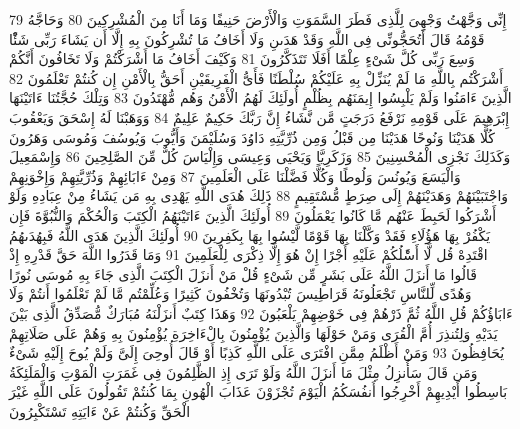 {\tiny\colorbox{cl_aya}{79}} إِنِّى وَجَّهْتُ وَجْهِىَ لِلَّذِى فَطَرَ السَّمَوَتِ وَالْأَرْضَ حَنِيفًا وَمَا أَنَا مِنَ الْمُشْرِكِينَ
{\tiny\colorbox{cl_aya}{80}} وَحَاجَّهُ قَوْمُهُ قَالَ أَتُحَجُّونِّى فِى اللَّهِ وَقَدْ هَدَىنِ وَلَا أَخَافُ مَا تُشْرِكُونَ بِهِ إِلَّا أَن يَشَاءَ رَبِّى شَئًْا وَسِعَ رَبِّى كُلَّ شَىْءٍ عِلْمًا أَفَلَا تَتَذَكَّرُونَ
{\tiny\colorbox{cl_aya}{81}} وَكَيْفَ أَخَافُ مَا أَشْرَكْتُمْ وَلَا تَخَافُونَ أَنَّكُمْ أَشْرَكْتُم بِاللَّهِ مَا لَمْ يُنَزِّلْ بِهِ عَلَيْكُمْ سُلْطَنًا فَأَىُّ الْفَرِيقَيْنِ أَحَقُّ بِالْأَمْنِ إِن كُنتُمْ تَعْلَمُونَ
{\tiny\colorbox{cl_aya}{82}} الَّذِينَ ءَامَنُوا وَلَمْ يَلْبِسُوا إِيمَنَهُم بِظُلْمٍ أُولَئِكَ لَهُمُ الْأَمْنُ وَهُم مُّهْتَدُونَ
{\tiny\colorbox{cl_aya}{83}} وَتِلْكَ حُجَّتُنَا ءَاتَيْنَهَا إِبْرَهِيمَ عَلَى قَوْمِهِ نَرْفَعُ دَرَجَتٍ مَّن نَّشَاءُ إِنَّ رَبَّكَ حَكِيمٌ عَلِيمٌ
{\tiny\colorbox{cl_aya}{84}} وَوَهَبْنَا لَهُ إِسْحَقَ وَيَعْقُوبَ كُلًّا هَدَيْنَا وَنُوحًا هَدَيْنَا مِن قَبْلُ وَمِن ذُرِّيَّتِهِ دَاوُدَ وَسُلَيْمَنَ وَأَيُّوبَ وَيُوسُفَ وَمُوسَى وَهَرُونَ وَكَذَلِكَ نَجْزِى الْمُحْسِنِينَ
{\tiny\colorbox{cl_aya}{85}} وَزَكَرِيَّا وَيَحْيَى وَعِيسَى وَإِلْيَاسَ كُلٌّ مِّنَ الصَّلِحِينَ
{\tiny\colorbox{cl_aya}{86}} وَإِسْمَعِيلَ وَالْيَسَعَ وَيُونُسَ وَلُوطًا وَكُلًّا فَضَّلْنَا عَلَى الْعَلَمِينَ
{\tiny\colorbox{cl_aya}{87}} وَمِنْ ءَابَائِهِمْ وَذُرِّيَّتِهِمْ وَإِخْوَنِهِمْ وَاجْتَبَيْنَهُمْ وَهَدَيْنَهُمْ إِلَى صِرَطٍ مُّسْتَقِيمٍ
{\tiny\colorbox{cl_aya}{88}} ذَلِكَ هُدَى اللَّهِ يَهْدِى بِهِ مَن يَشَاءُ مِنْ عِبَادِهِ وَلَوْ أَشْرَكُوا لَحَبِطَ عَنْهُم مَّا كَانُوا يَعْمَلُونَ
{\tiny\colorbox{cl_aya}{89}} أُولَئِكَ الَّذِينَ ءَاتَيْنَهُمُ الْكِتَبَ وَالْحُكْمَ وَالنُّبُوَّةَ فَإِن يَكْفُرْ بِهَا هَؤُلَاءِ فَقَدْ وَكَّلْنَا بِهَا قَوْمًا لَّيْسُوا بِهَا بِكَفِرِينَ
{\tiny\colorbox{cl_aya}{90}} أُولَئِكَ الَّذِينَ هَدَى اللَّهُ فَبِهُدَىهُمُ اقْتَدِهْ قُل لَّا أَسَْٔلُكُمْ عَلَيْهِ أَجْرًا إِنْ هُوَ إِلَّا ذِكْرَى لِلْعَلَمِينَ
{\tiny\colorbox{cl_aya}{91}} وَمَا قَدَرُوا اللَّهَ حَقَّ قَدْرِهِ إِذْ قَالُوا مَا أَنزَلَ اللَّهُ عَلَى بَشَرٍ مِّن شَىْءٍ قُلْ مَنْ أَنزَلَ الْكِتَبَ الَّذِى جَاءَ بِهِ مُوسَى نُورًا وَهُدًى لِّلنَّاسِ تَجْعَلُونَهُ قَرَاطِيسَ تُبْدُونَهَا وَتُخْفُونَ كَثِيرًا وَعُلِّمْتُم مَّا لَمْ تَعْلَمُوا أَنتُمْ وَلَا ءَابَاؤُكُمْ قُلِ اللَّهُ ثُمَّ ذَرْهُمْ فِى خَوْضِهِمْ يَلْعَبُونَ
{\tiny\colorbox{cl_aya}{92}} وَهَذَا كِتَبٌ أَنزَلْنَهُ مُبَارَكٌ مُّصَدِّقُ الَّذِى بَيْنَ يَدَيْهِ وَلِتُنذِرَ أُمَّ الْقُرَى وَمَنْ حَوْلَهَا وَالَّذِينَ يُؤْمِنُونَ بِالْءَاخِرَةِ يُؤْمِنُونَ بِهِ وَهُمْ عَلَى صَلَاتِهِمْ يُحَافِظُونَ
{\tiny\colorbox{cl_aya}{93}} وَمَنْ أَظْلَمُ مِمَّنِ افْتَرَى عَلَى اللَّهِ كَذِبًا أَوْ قَالَ أُوحِىَ إِلَىَّ وَلَمْ يُوحَ إِلَيْهِ شَىْءٌ وَمَن قَالَ سَأُنزِلُ مِثْلَ مَا أَنزَلَ اللَّهُ وَلَوْ تَرَى إِذِ الظَّلِمُونَ فِى غَمَرَتِ الْمَوْتِ وَالْمَلَئِكَةُ بَاسِطُوا أَيْدِيهِمْ أَخْرِجُوا أَنفُسَكُمُ الْيَوْمَ تُجْزَوْنَ عَذَابَ الْهُونِ بِمَا كُنتُمْ تَقُولُونَ عَلَى اللَّهِ غَيْرَ الْحَقِّ وَكُنتُمْ عَنْ ءَايَتِهِ تَسْتَكْبِرُونَ
